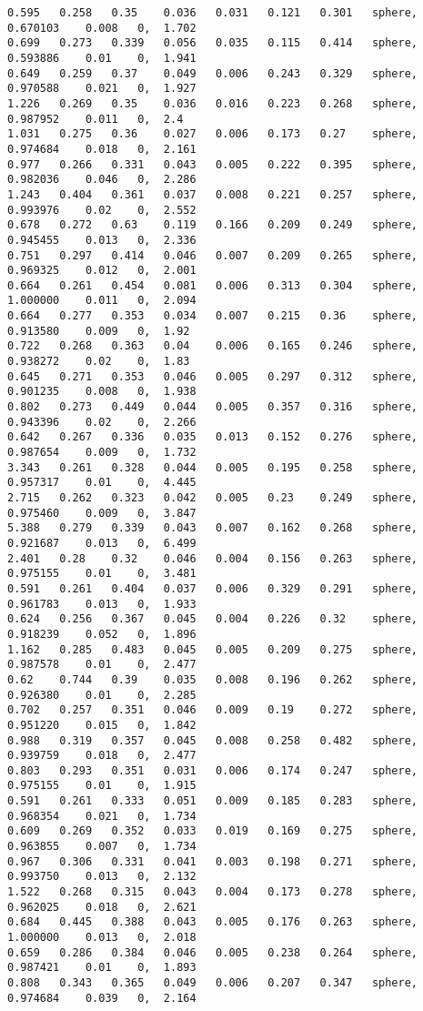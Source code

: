 {\fontsize{7.5}{10} \selectfont
\label{code:esferaAE}
\begin{lstlisting}[caption={Datos obtenidos para la prueba de la esfera usando AE.}]
0.595	0.258	0.35	0.036	0.031	0.121	0.301	sphere, 	0.670103	0.008	0, 	1.702
0.699	0.273	0.339	0.056	0.035	0.115	0.414	sphere, 	0.593886	0.01	0, 	1.941
0.649	0.259	0.37	0.049	0.006	0.243	0.329	sphere, 	0.970588	0.021	0, 	1.927
1.226	0.269	0.35	0.036	0.016	0.223	0.268	sphere, 	0.987952	0.011	0, 	2.4
1.031	0.275	0.36	0.027	0.006	0.173	0.27	sphere, 	0.974684	0.018	0, 	2.161
0.977	0.266	0.331	0.043	0.005	0.222	0.395	sphere, 	0.982036	0.046	0, 	2.286
1.243	0.404	0.361	0.037	0.008	0.221	0.257	sphere, 	0.993976	0.02	0, 	2.552
0.678	0.272	0.63	0.119	0.166	0.209	0.249	sphere, 	0.945455	0.013	0, 	2.336
0.751	0.297	0.414	0.046	0.007	0.209	0.265	sphere, 	0.969325	0.012	0, 	2.001
0.664	0.261	0.454	0.081	0.006	0.313	0.304	sphere,  	1.000000	0.011	0, 	2.094
0.664	0.277	0.353	0.034	0.007	0.215	0.36	sphere, 	0.913580	0.009	0, 	1.92
0.722	0.268	0.363	0.04	0.006	0.165	0.246	sphere, 	0.938272	0.02	0, 	1.83
0.645	0.271	0.353	0.046	0.005	0.297	0.312	sphere, 	0.901235	0.008	0, 	1.938
0.802	0.273	0.449	0.044	0.005	0.357	0.316	sphere, 	0.943396	0.02	0, 	2.266
0.642	0.267	0.336	0.035	0.013	0.152	0.276	sphere, 	0.987654	0.009	0, 	1.732
3.343	0.261	0.328	0.044	0.005	0.195	0.258	sphere, 	0.957317	0.01	0, 	4.445
2.715	0.262	0.323	0.042	0.005	0.23	0.249	sphere, 	0.975460	0.009	0, 	3.847
5.388	0.279	0.339	0.043	0.007	0.162	0.268	sphere, 	0.921687	0.013	0, 	6.499
2.401	0.28	0.32	0.046	0.004	0.156	0.263	sphere, 	0.975155	0.01	0, 	3.481
0.591	0.261	0.404	0.037	0.006	0.329	0.291	sphere, 	0.961783	0.013	0, 	1.933
0.624	0.256	0.367	0.045	0.004	0.226	0.32	sphere, 	0.918239	0.052	0, 	1.896
1.162	0.285	0.483	0.045	0.005	0.209	0.275	sphere, 	0.987578	0.01	0, 	2.477
0.62	0.744	0.39	0.035	0.008	0.196	0.262	sphere, 	0.926380	0.01	0, 	2.285
0.702	0.257	0.351	0.046	0.009	0.19	0.272	sphere, 	0.951220	0.015	0, 	1.842
0.988	0.319	0.357	0.045	0.008	0.258	0.482	sphere, 	0.939759	0.018	0, 	2.477
0.803	0.293	0.351	0.031	0.006	0.174	0.247	sphere, 	0.975155	0.01	0, 	1.915
0.591	0.261	0.333	0.051	0.009	0.185	0.283	sphere, 	0.968354	0.021	0, 	1.734
0.609	0.269	0.352	0.033	0.019	0.169	0.275	sphere, 	0.963855	0.007	0, 	1.734
0.967	0.306	0.331	0.041	0.003	0.198	0.271	sphere, 	0.993750	0.013	0, 	2.132
1.522	0.268	0.315	0.043	0.004	0.173	0.278	sphere, 	0.962025	0.018	0, 	2.621
0.684	0.445	0.388	0.043	0.005	0.176	0.263	sphere,  	1.000000	0.013	0, 	2.018
0.659	0.286	0.384	0.046	0.005	0.238	0.264	sphere, 	0.987421	0.01	0, 	1.893
0.808	0.343	0.365	0.049	0.006	0.207	0.347	sphere, 	0.974684	0.039	0, 	2.164

\end{lstlisting}}
